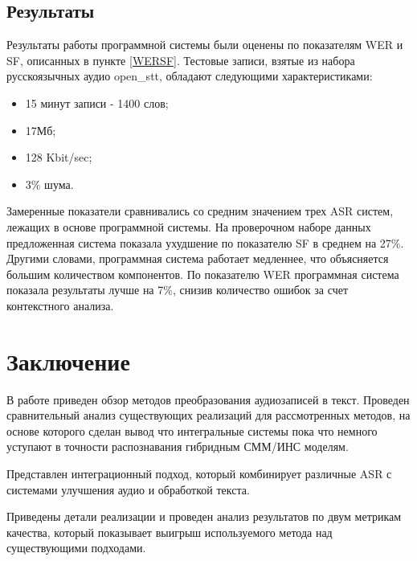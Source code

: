 \documentclass[conference]{IEEEtran}
\begin{document}
\subsection{Результаты}
Результаты работы программной системы были оценены по показателям WER и SF, описанных в пункте \ref{WERSF}.
Тестовые записи, взятые из набора русскоязычных аудио open\_stt, обладают следующими характеристиками:

\begin{itemize}
\item 15 минут записи - 1400 слов;
\item 17Мб;
\item 128 Kbit/sec;
\item 3\% шума.
\end{itemize}

Замеренные показатели сравнивались со средним значением трех ASR систем, лежащих в основе программной системы.
На проверочном наборе данных предложенная система показала ухудшение по показателю SF в среднем на 27\%.
Другими словами, программная система работает медленнее, что объясняется большим количеством компонентов.
По показателю WER программная система показала результаты лучше на 7\%, снизив количество ошибок за счет контекстного анализа.

\section{Заключение}
В работе приведен обзор методов преобразования аудиозаписей в текст. Проведен сравнительный анализ существующих реализаций для рассмотренных методов, на основе которого сделан вывод что интегральные системы пока что немного уступают в точности распознавания гибридным СММ/ИНС моделям.

Представлен интеграционный подход, который комбинирует различные ASR с системами улучшения аудио и обработкой текста.

Приведены детали реализации и проведен анализ результатов по двум метрикам качества, который показывает выигрыш используемого метода над существующими подходами.
\end{document}
